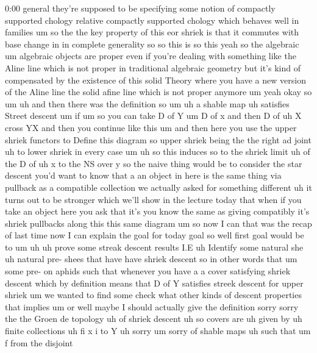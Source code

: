 \begin{unfinished}{0:00}
general  they're  supposed  to  be
specifying  some  notion  of  compactly
supported  chology  relative  compactly
supported  chology  which  behaves  well  in
families
um  so  the  the  key  property  of  this  eor
shriek  is  that  it  commutes  with  base
change  in  in  complete
generality  so  so  this  is  so  this  yeah  so
the  algebraic
um  algebraic  objects  are  proper  even  if
you're  dealing  with  something  like  the
Aline  line  which  is  not  proper  in
traditional  algebraic  geometry  but  it's
kind  of  compensated  by  the  existence  of
this  solid  Theory  where  you  have  a  new
version  of  the  Aline  line  the  solid
afine  line  which  is  not  proper  anymore
um
yeah
okay  so
um  uh  and  then  there  was  the  definition
so
um  uh  a  shable  map
uh  satisfies  Street  descent
um
if  um  so  you  can  take  D  of  Y
um  D  of  x  and  then  D  of  uh  X  cross  YX
and  then  you  continue  like  this  um  and
then  here  you  use  the  upper  shriek
functors  to  Define  this  diagram  so  upper
shriek  being  the  the  right  ad
joint  uh  to  lower  shriek  in  every
case  um  uh  so  this
induces
so  to  the  shriek  limit  uh  of  the  D  of  uh
x  to  the  NS  over
y  so  the  naive  thing  would  be  to
consider  the  star  descent  you'd  want  to
know  that  a  an  object  in  here  is  the
same  thing  via  pullback  as  a  compatible
collection  we  actually  asked  for
something  different  uh  it  turns  out  to
be  stronger  which  we'll  show  in  the
lecture  today  that  when  if  you  take  an
object  here  you  ask  that  it's  you  know
the  same  as  giving  compatibly  it's
shriek  pullbacks  along  this  this  same
diagram
um  so  now  I  can  that  was  the  recap  of
last  time  now  I  can  explain  the  goal  for
today
goal  so  well  first  goal  would  be  to
um
uh  uh  prove
some  streak  descent
results  I.E  uh
Identify  some  natural  she  uh  natural
pre-
shees  that  have  have  shriek
descent  so  in  other  words  that
um  some  pre-  on  aphids  such  that
whenever  you  have  a  a  cover  satisfying
shriek  descent  which  by  definition  means
that  D  of  Y  satisfies  streek  descent  for
upper  shriek  um  we  wanted  to  find  some
check  what  other  kinds  of  descent
properties  that
implies
um  or  well  maybe  I  should  actually  give
the  definition  sorry  sorry  the  the  Groen
de
topology  uh  of  shriek
descent  uh  so
covers  are  uh  given
by  uh  finite
collections  uh
fi  x  i  to  Y  uh  sorry  um  sorry
of  shable
maps  uh  such  that  um  f  from  the  disjoint

\end{unfinished}
